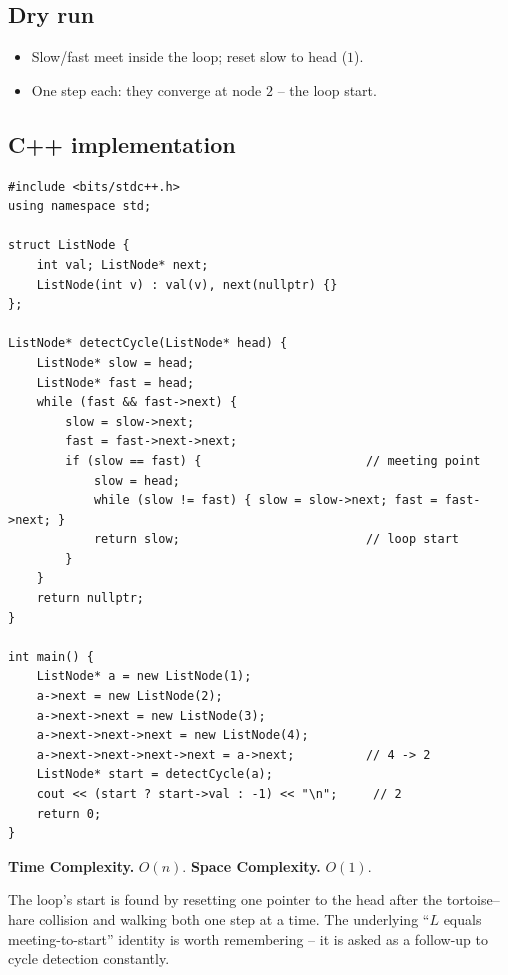 \subsection*{Dry run}


\begin{itemize}
  \item Slow/fast meet inside the loop; reset slow to head ($1$).
  \item One step each: they converge at node $2$ -- the loop start.
\end{itemize}

\subsection*{C++ implementation}

\begin{lstlisting}
#include <bits/stdc++.h>
using namespace std;

struct ListNode {
    int val; ListNode* next;
    ListNode(int v) : val(v), next(nullptr) {}
};

ListNode* detectCycle(ListNode* head) {
    ListNode* slow = head;
    ListNode* fast = head;
    while (fast && fast->next) {
        slow = slow->next;
        fast = fast->next->next;
        if (slow == fast) {                       // meeting point
            slow = head;
            while (slow != fast) { slow = slow->next; fast = fast->next; }
            return slow;                          // loop start
        }
    }
    return nullptr;
}

int main() {
    ListNode* a = new ListNode(1);
    a->next = new ListNode(2);
    a->next->next = new ListNode(3);
    a->next->next->next = new ListNode(4);
    a->next->next->next->next = a->next;          // 4 -> 2
    ListNode* start = detectCycle(a);
    cout << (start ? start->val : -1) << "\n";     // 2
    return 0;
}
\end{lstlisting}

\begin{complexitybox}
\textbf{Time Complexity.} $O(n)$. \textbf{Space Complexity.} $O(1)$.
\end{complexitybox}

\begin{takeawaybox}
The loop's start is found by resetting one pointer to the head after the
tortoise--hare collision and walking both one step at a time. The
underlying ``$L$ equals meeting-to-start'' identity is worth remembering --
it is asked as a follow-up to cycle detection constantly.
\end{takeawaybox}
